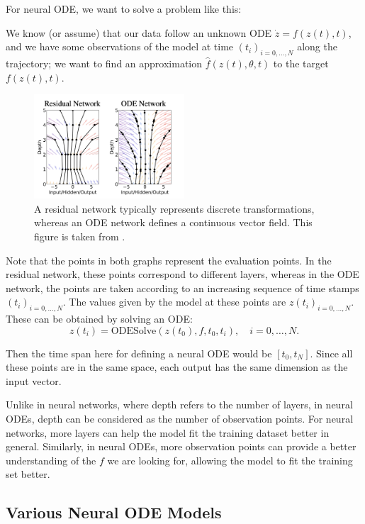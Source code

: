 \documentclass[a4paper,11pt,titlepage]{article}
\theoremstyle{definition}
\theoremstyle{plain}
\theoremstyle{remark}
\begin{document}
For neural ODE, we want to solve a problem like this: 

We know (or assume) that our data follow an unknown ODE $\dot{z}=f(z(t),t)$, and we have some observations of the model at time $(t_i)_{i=0,\dots,N}$ along the trajectory; we want to find an approximation $\hat{f}(z(t),\theta,t)$ to the target $f(z(t),t)$.

\begin{figure}[htbp]
    \centering
    \includegraphics[width=0.5\textwidth]{report/figures/ResNetvsODENet.png}
    \caption{A residual network typically represents discrete transformations, whereas an ODE network defines a continuous vector field. This figure is taken from \cite{chen2018neural}.}
    \label{fig:enter-label}
\end{figure}

Note that the points in both graphs represent the evaluation points. In the residual network, these points correspond to different layers, whereas in the ODE network, the points are taken according to an increasing sequence of time stamps $(t_i)_{i=0,\dots,N}$. The values given by the model at these points are $z(t_i)_{i=0,\dots,N}$. These can be obtained by solving an ODE:
$$z(t_i)=\mathrm{ODESolve}(z(t_0),f,t_0,t_i),\quad i=0,\dots,N.$$

Then the time span here for defining a neural ODE would be $[t_0,t_N]$. Since all these points are in the same space, each output has the same dimension as the input vector.

Unlike in neural networks, where depth refers to the number of layers, in neural ODEs, depth can be considered as the number of observation points. For neural networks, more layers can help the model fit the training dataset better in general. Similarly, in neural ODEs, more observation points can provide a better understanding of the $f$ we are looking for, allowing the model to fit the training set better.

\subsection{Various Neural ODE Models}
\end{document}
